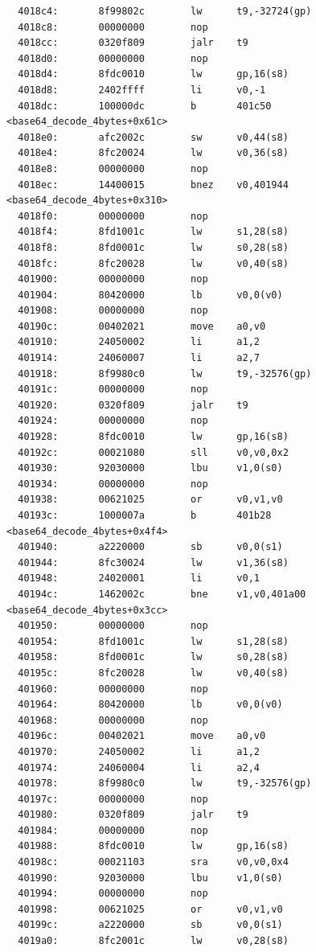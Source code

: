 \documentclass[11pt]{article}
\begin{document}
\begin{verbatim}
  4018c4:       8f99802c        lw      t9,-32724(gp)
  4018c8:       00000000        nop
  4018cc:       0320f809        jalr    t9
  4018d0:       00000000        nop
  4018d4:       8fdc0010        lw      gp,16(s8)
  4018d8:       2402ffff        li      v0,-1
  4018dc:       100000dc        b       401c50 <base64_decode_4bytes+0x61c>
  4018e0:       afc2002c        sw      v0,44(s8)
  4018e4:       8fc20024        lw      v0,36(s8)
  4018e8:       00000000        nop
  4018ec:       14400015        bnez    v0,401944 <base64_decode_4bytes+0x310>
  4018f0:       00000000        nop
  4018f4:       8fd1001c        lw      s1,28(s8)
  4018f8:       8fd0001c        lw      s0,28(s8)
  4018fc:       8fc20028        lw      v0,40(s8)
  401900:       00000000        nop
  401904:       80420000        lb      v0,0(v0)
  401908:       00000000        nop
  40190c:       00402021        move    a0,v0
  401910:       24050002        li      a1,2
  401914:       24060007        li      a2,7
  401918:       8f9980c0        lw      t9,-32576(gp)
  40191c:       00000000        nop
  401920:       0320f809        jalr    t9
  401924:       00000000        nop
  401928:       8fdc0010        lw      gp,16(s8)
  40192c:       00021080        sll     v0,v0,0x2
  401930:       92030000        lbu     v1,0(s0)
  401934:       00000000        nop
  401938:       00621025        or      v0,v1,v0
  40193c:       1000007a        b       401b28 <base64_decode_4bytes+0x4f4>
  401940:       a2220000        sb      v0,0(s1)
  401944:       8fc30024        lw      v1,36(s8)
  401948:       24020001        li      v0,1
  40194c:       1462002c        bne     v1,v0,401a00 <base64_decode_4bytes+0x3cc>
  401950:       00000000        nop
  401954:       8fd1001c        lw      s1,28(s8)
  401958:       8fd0001c        lw      s0,28(s8)
  40195c:       8fc20028        lw      v0,40(s8)
  401960:       00000000        nop
  401964:       80420000        lb      v0,0(v0)
  401968:       00000000        nop
  40196c:       00402021        move    a0,v0
  401970:       24050002        li      a1,2
  401974:       24060004        li      a2,4
  401978:       8f9980c0        lw      t9,-32576(gp)
  40197c:       00000000        nop
  401980:       0320f809        jalr    t9
  401984:       00000000        nop
  401988:       8fdc0010        lw      gp,16(s8)
  40198c:       00021103        sra     v0,v0,0x4
  401990:       92030000        lbu     v1,0(s0)
  401994:       00000000        nop
  401998:       00621025        or      v0,v1,v0
  40199c:       a2220000        sb      v0,0(s1)
  4019a0:       8fc2001c        lw      v0,28(s8)

\end{verbatim}
\end{document}

